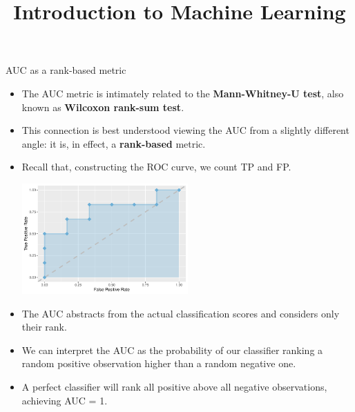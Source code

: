 \documentclass[11pt,compress,t,notes=noshow, xcolor=table]{beamer}
\title{Introduction to Machine Learning}
\institute{\href{https://compstat-lmu.github.io/lecture_i2ml/}{compstat-lmu.github.io/lecture\_i2ml}}
\date{}
\begin{document}








\begin{vbframe}{AUC as a rank-based metric}

\begin{itemize}
  \item The AUC metric is intimately related to the \textbf{Mann-Whitney-U 
  test}, also known as \textbf{Wilcoxon rank-sum test}.
  \item This connection is best understood viewing the AUC from a slightly 
  different angle: it is, in effect, a \textbf{rank-based} metric.
  \item Recall that, constructing the ROC curve, we count TP and FP.
  \begin{center}
  \includegraphics[trim = 0 0 0 -20, clip, width=0.5\textwidth]
  {figure/eval_mclass_roc_sp_12_1} 
  \end{center}
  \item The AUC abstracts from the actual classification scores and
  considers only their rank.
\end{itemize}

\framebreak 

\begin{itemize}
  \small
  \item We can interpret the AUC as the probability of our classifier 
  ranking a random positive observation higher than a random negative one.
  \item A perfect classifier will rank all positive above all negative 
  observations, achieving AUC = 1.
\end{itemize}


\end{vbframe}
\end{document}
